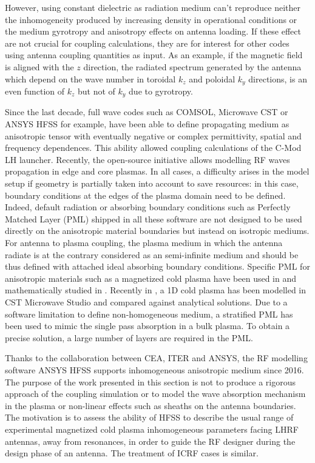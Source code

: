 However, using constant dielectric as radiation medium can't reproduce neither the inhomogeneity produced by increasing density in operational conditions or the medium gyrotropy and anisotropy effects on antenna loading. If these effect are not crucial for coupling calculations, they are for interest for other codes using antenna coupling quantities as input. As an example, if the magnetic field is aligned with the $z$ direction, the radiated spectrum generated by the antenna which depend on the wave number in toroidal $k_z$ and poloidal $k_y$ directions, is an even function of $k_z$ but not of $k_y$ due to gyrotropy.

Since the last decade, full wave codes such as {COMSOL}, Microwave {CST} or {ANSYS} {HFSS} for example, have been able to define propagating medium as anisotropic tensor with eventually negative or complex permittivity, spatial and frequency dependences. This ability allowed coupling calculations of the C-Mod LH launcher. Recently, the open-source initiative  allows modelling RF waves propagation in edge and core plasmas. In all cases, a difficulty arises in the model setup if  geometry is partially taken into account to save resources: in this case, boundary conditions at the edges of the plasma domain need to be defined. Indeed, default radiation or absorbing boundary conditions such as Perfectly Matched Layer (PML) shipped in all these software are not designed to be used directly on the anisotropic material boundaries but instead on isotropic mediums. For antenna to plasma coupling, the plasma medium in which the antenna radiate is at the contrary considered as an semi-infinite medium and should be thus defined with attached ideal absorbing boundary conditions. Specific PML for anisotropic materials such as a magnetized cold plasma have been used in  and mathematically studied in  . Recently in , a 1D cold plasma has been modelled in CST Microwave Studio and compared against analytical solutions. Due to a software limitation to define non-homogeneous medium, a stratified PML has been used to mimic the single pass absorption in a bulk plasma. To obtain a precise solution, a large number of layers are required in the PML. 

Thanks to the collaboration between CEA, ITER and ANSYS, the RF modelling software ANSYS HFSS supports inhomogeneous anisotropic medium since 2016. The purpose of the work presented in this section is not to produce a rigorous approach of the coupling simulation or to model the wave absorption mechanism in the plasma or non-linear effects such as sheaths  on the antenna boundaries. The motivation is to assess the ability of HFSS to describe the usual range of experimental magnetized cold plasma inhomogeneous parameters facing LHRF antennas, away from resonances, in order to guide the RF designer during the design phase of an antenna. The treatment of ICRF cases is similar.

